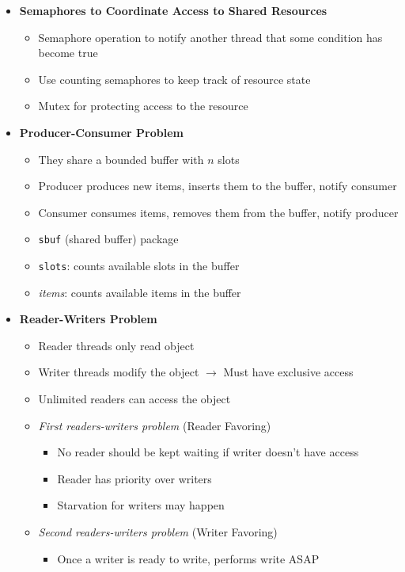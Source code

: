 \documentclass[12pt]{article}
\begin{document}
{\begin{itemize}
\begin{itemize}
	\end{itemize}
	\item \textbf{Semaphores to Coordinate Access to Shared Resources}
	\begin{itemize}
		\item Semaphore operation to notify another thread that some condition has become true
		\item Use counting semaphores to keep track of resource state
		\item Mutex for protecting access to the resource
	\end{itemize}
	\item \textbf{Producer-Consumer Problem}
	\begin{itemize}
		\item They share a bounded buffer with $n$ slots
		\item Producer produces new items, inserts them to the buffer, notify consumer
		\item Consumer consumes items, removes them from the buffer, notify producer
		\item \texttt{sbuf} (shared buffer) package
		\item \texttt{slots}: counts available slots in the buffer
		\item \textit{items}: counts available items in the buffer
	\end{itemize}
	\item \textbf{Reader-Writers Problem}
	\begin{itemize}
		\item Reader threads only read object
		\item Writer threads modify the object $\rightarrow$ Must have exclusive access
		\item Unlimited readers can access the object
		\item \textit{First readers-writers problem} (Reader Favoring)
		\begin{itemize}
			\item No reader should be kept waiting if writer doesn't have access
			\item Reader has priority over writers
			\item Starvation for writers may happen
		\end{itemize} 
		\item \textit{Second readers-writers problem} (Writer Favoring)
		\begin{itemize}
			\item Once a writer is ready to write, performs write ASAP

\end{itemize}
\end{itemize}
\end{itemize}}
\end{document}
